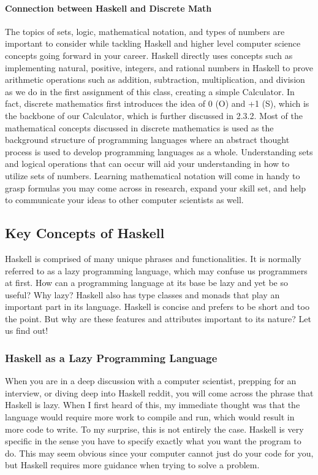 \documentclass{article}
\begin{document}
\paragraph{Connection between Haskell and Discrete Math}
The topics of sets, logic, mathematical notation, and types of numbers are important to consider while tackling Haskell and higher level computer science concepts going forward in your career. Haskell directly uses concepts such as implementing natural, positive, integers, and rational numbers in Haskell to prove arithmetic operations such as addition, subtraction, multiplication, and division as we do in the first assignment of this class, creating a simple Calculator. In fact, discrete mathematics first introduces the idea of 0 (O) and +1 (S), which is the backbone of our Calculator, which is further discussed in 2.3.2. Most of the mathematical concepts discussed in discrete mathematics is used as the background structure of programming languages where an abstract thought process is used to develop programming languages as a whole. Understanding sets and logical operations that can occur will aid your understanding in how to utilize sets of numbers. Learning mathematical notation will come in handy to grasp formulas you may come across in research, expand your skill set, and help to communicate your ideas to other computer scientists as well.

\subsection{Key Concepts of Haskell}

Haskell is comprised of many unique phrases and functionalities. It is normally referred to as a lazy programming language, which may confuse us programmers at first. How can a programming language at its base be lazy and yet be so useful? Why lazy? Haskell also has type classes and monads that play an important part in its language. Haskell is concise and prefers to be short and too the point. But why are these features and attributes important to its nature? Let us find out!

\subsubsection{Haskell as a Lazy Programming Language}

When you are in a deep discussion with a computer scientist, prepping for an interview, or diving deep into Haskell reddit, you will come across the phrase that Haskell is lazy. When I first heard of this, my immediate thought was that the language would require more work to compile and run, which would result in more code to write. To my surprise, this is not entirely the case. Haskell is very specific in the sense you have to specify exactly what you want the program to do. This may seem obvious since your computer cannot just do your code for you, but Haskell requires more guidance when trying to solve a problem. 
\end{document}
